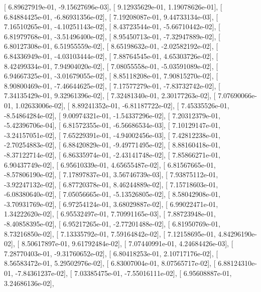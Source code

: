 \documentclass{article}
\begin{document}
       [  6.89627919e-01,  -9.15627696e-03],
       [  9.12935629e-01,   1.19078626e-01],
       [  6.84884425e-01,  -6.86931356e-02],
       [  7.19208087e-01,   9.44733134e-03],
       [  7.16510265e-01,  -4.10251143e-02],
       [  8.43723544e-01,  -5.66710442e-02],
       [  6.81979768e-01,  -3.51496400e-02],
       [  8.95450713e-01,  -7.32947889e-02],
       [  6.80127308e-01,   6.51955559e-02],
       [  8.65198632e-01,  -2.02582192e-02],
       [  6.84336949e-01,  -4.03103444e-02],
       [  7.88764545e-01,   4.65303726e-02],
       [  8.42499334e-01,   7.94904020e-02],
       [  7.08055558e-01,  -5.03591089e-02],
       [  6.94667325e-01,  -3.01679055e-02],
       [  8.85118208e-01,   7.90815270e-02],
       [  8.90800469e-01,  -7.46644625e-02],
       [  7.17577279e-01,  -7.83732742e-02],
       [  7.34135429e-01,   9.32961396e-02],
       [  7.32481340e-01,   2.30177263e-02],
       [  7.07690066e-01,   1.02633006e-02],
       [  8.89241352e-01,  -6.81187722e-02],
       [  7.45335526e-01,  -8.54864284e-02],
       [  9.00974321e-01,  -1.54337296e-02],
       [  7.20312379e-01,  -5.42396706e-04],
       [  6.81572355e-01,  -6.56686534e-03],
       [  7.10129147e-01,  -3.24157051e-02],
       [  7.65229391e-01,  -4.94002456e-03],
       [  7.42812238e-01,  -2.70254883e-02],
       [  6.88420829e-01,  -9.49771495e-02],
       [  8.88160418e-01,  -8.37122714e-02],
       [  6.86335974e-01,  -2.43141748e-02],
       [  7.85866271e-01,   6.90437749e-02],
       [  6.95610339e-01,   4.65655487e-02],
       [  6.81567665e-01,  -8.57806190e-02],
       [  7.17897837e-01,   3.56746739e-03],
       [  7.93875112e-01,  -3.92247132e-02],
       [  6.87720378e-01,   8.46244889e-02],
       [  7.15718603e-01,  -6.08380640e-02],
       [  7.05056665e-01,  -5.13526805e-02],
       [  8.58042908e-01,  -3.70931769e-02],
       [  6.97254124e-01,   3.68029887e-02],
       [  6.99022471e-01,   1.34222620e-02],
       [  6.95532497e-01,   7.70991165e-03],
       [  7.88723948e-01,  -8.40858395e-02],
       [  6.95217265e-01,  -2.77201488e-02],
       [  6.81950769e-01,   8.73216850e-02],
       [  7.13335792e-01,   7.59164842e-02],
       [  7.12158695e-01,   4.84296190e-02],
       [  8.50617897e-01,   9.61792484e-02],
       [  7.07440991e-01,   4.24684426e-03],
       [  7.28770403e-01,  -9.31760652e-02],
       [  6.80418253e-01,   2.10717176e-02],
       [  8.56583472e-01,   5.29502976e-02],
       [  6.83007004e-01,   8.07565717e-02],
       [  6.88124310e-01,  -7.84361237e-02],
       [  7.03385475e-01,  -7.55016111e-02],
       [  6.95608887e-01,   3.24686136e-02],
\end{document}
